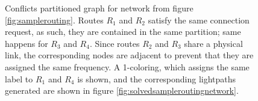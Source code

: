 \begin{figure}[h]
		\centering	
	
		\label{fig:solvedsamplerouting}
		\caption{Conflicts partitioned graph for network from figure \ref{fig:samplerouting}. Routes $R_1$ and $R_2$ satisfy the same connection request, as such, they are contained in the same partition; same happens for $R_3$ and $R_4$. Since routes $R_2$ and $R_3$ share a physical link, the corresponding nodes are adjacent to prevent that they are assigned the same frequency. A 1-coloring, which assigns the same label to $R_1$ and $R_4$ is shown, and the corresponding lightpaths generated are shown in figure \ref{fig:solvedsampleroutingnetwork}.}
\end{figure}

